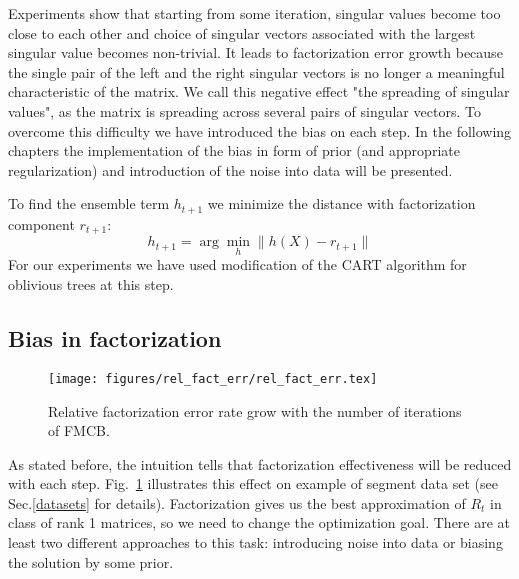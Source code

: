 \documentclass{article}
\begin{document}
Experiments show that starting from some iteration, singular values become too close to each other and choice of singular vectors associated with the largest singular value becomes non-trivial. It leads to factorization error growth because the single pair of the left and the right singular vectors is no longer a meaningful characteristic of the matrix. We call this negative effect "the spreading of singular values", as the matrix is spreading across several pairs of singular vectors. To overcome this difficulty we have introduced the bias on each step. In the following chapters the implementation of the bias in form of prior (and appropriate regularization) and introduction of the noise into data will be presented.

To find the ensemble term $h_{t+1}$ we minimize the distance with factorization component $r_{t+1}$:
\begin{equation}
h_{t+1}	= \arg \min_{h} \|h(X) - r_{t+1}\|
\label{eq:minimization_step}
\end{equation}
For our experiments we have used modification of the CART algorithm for oblivious trees \cite{Gulin_winningthe} at this step.


\subsection{Bias in factorization}

\begin{figure}
\vskip 0.2in
\begin{center}
\centerline{\texttt{[image: figures/rel\_fact\_err/rel\_fact\_err.tex]}}
\caption{Relative factorization error rate grow with the number of iterations of FMCB.}
\end{center}
\label{fig:factorization-effectiveness}
\vskip -0.2in
\end{figure}

As stated before, the intuition tells that factorization effectiveness will be reduced with each step. Fig.~\ref{fig:factorization-effectiveness} illustrates this effect on example of segment data set (see Sec.\ref{datasets} for details). Factorization gives us the best approximation of $R_t$ in class of rank 1 matrices, so we need to change the optimization goal. There are at least two different approaches to this task: introducing noise into data or biasing the solution by some prior.
\end{document}
